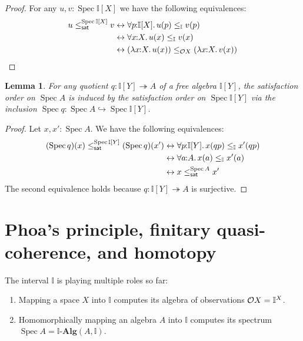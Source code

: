 \documentclass[a4paper,12pt]{amsart}
\newtheorem{lemma}[theorem]{Lemma}
\newtheorem{corollary}[theorem]{Corollary}
\theoremstyle{definition}
\newcommand{\mb}[1]{\mathbf{#1}}
\newcommand{\mbb}[1]{\mathbb{#1}}
\newcommand{\I}{\mbb I}
\newcommand{\alg}{\text{-}\mb{Alg}}
\newcommand{\surj}{\twoheadrightarrow}
\newcommand{\hook}{\hookrightarrow}
\newcommand{\fa}[2]{\forall #1\!\colon\!\!#2\mathpunct{.}}
\newcommand{\ld}[2]{\lambda #1\!\colon\!\!#2\mathpunct{.}}
\newcommand{\eq}{\leftrightarrow}
\newcommand{\spec}{\operatorname{Spec}}
\begin{document}
\begin{proof}
  For any $u,v:\spec{\I[X]}$ we have the following equivalences:
  \begin{align*}
    u \satle[\spec{\I[X]}] v
    &\eq \fa{p}{\I[X]} u(p) \le_{\I} v(p)
    \\ 
    &\eq \fa{x}{X} u(x) \le_{\I} v(x)
    \\ 
    &\eq (\ld{x}{X}u(x)) \le_{\opens{X}} (\ld{x}{X}v(x))
    \qedhere
  \end{align*}
\end{proof}


\begin{lemma}\label{lem:cancoincide}
  For any quotient $q \colon \I[Y] \surj A$ of a free algebra $\I[Y]$, the satisfaction order on $\spec A$ is induced by the satisfaction order on $\spec{\I[Y]}$ via the inclusion ${\spec{q}}\colon\spec{A}\hook \spec{\I[Y]}$.
\end{lemma} 

\begin{proof}
  Let $x,x' : \spec A$. We have the following equivalences:
  \begin{align*}
    (\spec{q})(x)\satle[\spec{\I[Y]}] (\spec{q})(x')
    &\eq 
    \fa{p}{\I[Y]}
    x(qp) \le_\I x'(qp)
    \\ 
    &\eq 
    \fa{a}{A} x(a) \le_\I x'(a) 
    \\ 
    &\eq 
    x\satle[\spec{A}] x'
  \end{align*}
% 
  The second equivalence holds because $q\colon \I[Y]\surj A$ is surjective.
\end{proof}



\section{Phoa's principle, finitary quasi-coherence, and homotopy}

The interval $\I$ is playing multiple roles so far:
\begin{enumerate}
  \item Mapping a space $X$ into $\I$ computes its algebra of observations $\opens{X} = \I^X$.
  \item Homomorphically mapping an algebra $A$ into $\I$ computes its spectrum $\spec{A} = \I\alg(A,\I)$.
\end{enumerate}
\end{document}
